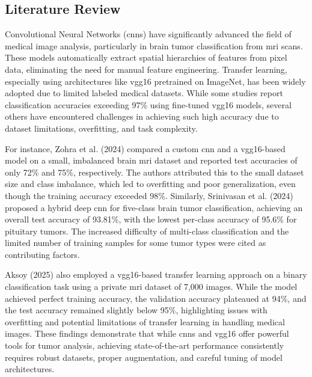\subsection{Literature Review}
Convolutional Neural Networks (\gls{cnn}s) have significantly advanced the field of medical image analysis, particularly in brain tumor classification from \gls{mri} scans. These models automatically extract spatial hierarchies of features from pixel data, eliminating the need for manual feature engineering. Transfer learning, especially using architectures like \gls{vgg16} pretrained on ImageNet, has been widely adopted due to limited labeled medical datasets. While some studies report classification accuracies exceeding 97\% using fine-tuned \gls{vgg16} models\cite{mathivanan2024}\cite{babu2023}\cite{khaliki2024}, several others have encountered challenges in achieving such high accuracy due to dataset limitations, overfitting, and task complexity.

For instance, Zohra et al. (2024) compared a custom \gls{cnn} and a \gls{vgg16}-based model on a small, imbalanced brain \gls{mri} dataset and reported test accuracies of only 72\% and 75\%, respectively. The authors attributed this to the small dataset size and class imbalance, which led to overfitting and poor generalization, even though the training accuracy exceeded 98\%\cite{zohra2024}. Similarly, Srinivasan et al. (2024) proposed a hybrid deep \gls{cnn} for five-class brain tumor classification, achieving an overall test accuracy of 93.81\%, with the lowest per-class accuracy of 95.6\% for pituitary tumors. The increased difficulty of multi-class classification and the limited number of training samples for some tumor types were cited as contributing factors\cite{srinivasan2024}.

Aksoy (2025) also employed a \gls{vgg16}-based transfer learning approach on a binary classification task using a private \gls{mri} dataset of 7,000 images. While the model achieved perfect training accuracy, the validation accuracy plateaued at 94\%, and the test accuracy remained slightly below 95\%, highlighting issues with overfitting and potential limitations of transfer learning in handling medical images\cite{aksoy2025}. These findings demonstrate that while \gls{cnn}s and \gls{vgg16} offer powerful tools for tumor analysis, achieving state-of-the-art performance consistently requires robust datasets, proper augmentation, and careful tuning of model architectures.